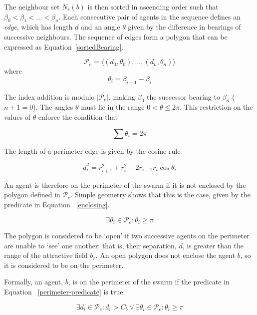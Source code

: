 \documentclass[12pt,a4paper]{IEEEtran}
\begin{document}
The neighbour set $N_r(b)$ is then sorted in ascending order such that $\beta_0 < \beta_1 < \ldots < \beta_n$. Each consecutive pair of agents in the sequence defines an \textit{edge}, which has length $d$ and an angle $\theta$ given by the difference in bearings of successive neighbours. The sequence of edges form a polygon that can be expressed as Equation~\ref{sortedBearing}.

\begin{equation}\label{sortedBearing}
\mathcal{P}_e = \langle (d_0,\theta_0), \ldots , (d_n,\theta_n) \rangle
\end{equation}
where
\begin{equation}
\theta_i = \beta_{i+1} - \beta_i
\end{equation}

The index addition is modulo $|\mathcal{P}_e|$, making $\beta_0$ the successor bearing to $\beta_n$ ($n+1 = 0$).  The angles $\theta$ must lie in the range $0<\theta\leq2\pi$. This restriction on the values of $\theta$ enforce the condition that

\begin{equation}
\sum\theta_i = 2\pi
\end{equation}

The length of a perimeter edge is given by the cosine rule

\begin{equation}
d_i^2 = r_{i+1}^2 + r_i^2 -2r_{i+1}r_i \cos\theta_i
\end{equation}

An agent is therefore on the perimeter of the swarm if it is not enclosed by the polygon defined in $\mathcal{P}_e$.  Simple geometry shows that this is the case, given by the predicate in Equation ~\ref{enclosing}.

\begin{equation}
\exists \theta_i \in \mathcal{P}_e : \theta_i\geq\pi
\label{enclosing}
\end{equation}

The polygon is considered to be `open' if two successive agents on the perimeter are unable to `see' one another; that is, their separation, $d$, is greater than the range of the attractive field $b_r$.  An open polygon does not enclose the agent $b$, so it is considered to be on the perimeter. 

Formally, an agent, $b$, is on the perimeter of the swarm if the predicate in Equation ~\ref{perimeter-predicate} is true.

\begin{equation}
\exists d_i\in\mathcal{P}_e:d_i>C_b \vee
\exists\theta_i\in\mathcal{P}_e:\theta_i\geq\pi
\label{perimeter-predicate}
\end{equation}
\end{document}
